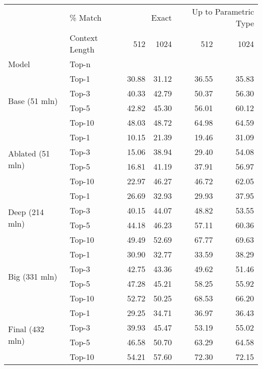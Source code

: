 \begin{tabular}{llrrrr}
\toprule
 & \% Match & \multicolumn{2}{r}{Exact} & \multicolumn{2}{r}{Up to Parametric Type} \\
 & Context Length & 512 & 1024 & 512 & 1024 \\
Model & Top-n &  &  &  &  \\
\midrule
\multirow[t]{4}{*}{Base (51 mln)} & Top-1 & 30.88 & 31.12 & 36.55 & 35.83 \\
 & Top-3 & 40.33 & 42.79 & 50.37 & 56.30 \\
 & Top-5 & 42.82 & 45.30 & 56.01 & 60.12 \\
 & Top-10 & 48.03 & 48.72 & 64.98 & 64.59 \\
\cline{1-6}
\multirow[t]{4}{*}{Ablated (51 mln)} & Top-1 & 10.15 & 21.39 & 19.46 & 31.09 \\
 & Top-3 & 15.06 & 38.94 & 29.40 & 54.08 \\
 & Top-5 & 16.81 & 41.19 & 37.91 & 56.97 \\
 & Top-10 & 22.97 & 46.27 & 46.72 & 62.05 \\
\cline{1-6}
\multirow[t]{4}{*}{Deep (214 mln)} & Top-1 & 26.69 & 32.93 & 29.93 & 37.95 \\
 & Top-3 & 40.15 & 44.07 & 48.82 & 53.55 \\
 & Top-5 & 44.18 & 46.23 & 57.11 & 60.36 \\
 & Top-10 & 49.49 & 52.69 & 67.77 & 69.63 \\
\cline{1-6}
\multirow[t]{4}{*}{Big (331 mln)} & Top-1 & 30.90 & 32.77 & 33.59 & 38.29 \\
 & Top-3 & 42.75 & 43.36 & 49.62 & 51.46 \\
 & Top-5 & 47.28 & 45.21 & 58.25 & 55.92 \\
 & Top-10 & 52.72 & 50.25 & 68.53 & 66.20 \\
\cline{1-6}
\multirow[t]{4}{*}{Final (432 mln)} & Top-1 & 29.25 & 34.71 & 36.97 & 36.43 \\
 & Top-3 & 39.93 & 45.47 & 53.19 & 55.02 \\
 & Top-5 & 46.58 & 50.70 & 63.29 & 64.58 \\
 & Top-10 & 54.21 & 57.60 & 72.30 & 72.15 \\
\cline{1-6}
\bottomrule
\end{tabular}

